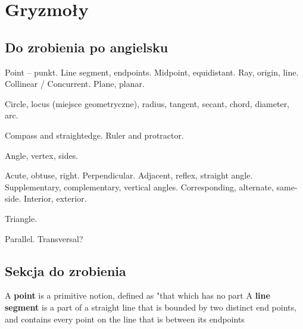 \documentclass{parchment}
\begin{document}

\chapter{Gryzmoły}
\section{Do zrobienia po angielsku}
Point -- punkt.
Line segment, endpoints.
Midpoint, equidistant.
Ray, origin, line.
Collinear / Concurrent.
Plane, planar.

Circle, locus (miejsce geometryczne), radius, tangent, secant, chord, diameter, arc.

Compass and straightedge.
Ruler and protractor.

Angle, vertex, sides.

Acute, obtuse, right.
Perpendicular.
Adjacent, reflex, straight angle.
Supplementary, complementary, vertical angles.
Corresponding, alternate, same-side. Interior, exterior.

Triangle.

Parallel.
Transversal?

\section{Sekcja do zrobienia}



A \textbf{point} is a primitive notion, defined as "that which has no part
A \textbf{line segment} is a part of a straight line that is bounded by two distinct end points, and contains every point on the line that is between its endpoints


\raggedright
{}
\printindex

\printindex[persons]
\end{document}
